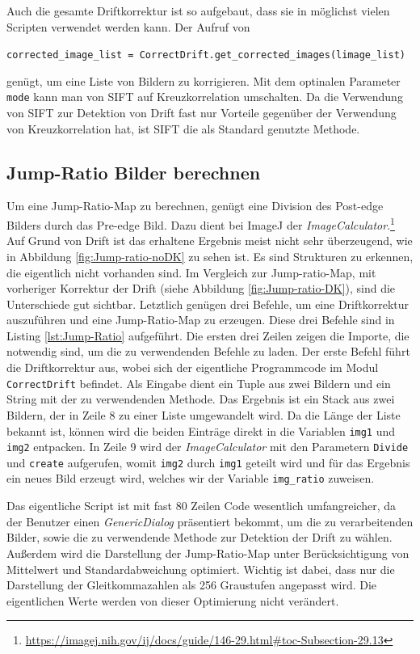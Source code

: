 \documentclass[
	paper=a4,				%
	twoside=true,			%
	BCOR=6mm,				%
	fontsize=12pt,			%
	pagesize=auto,			%
	numbers=noenddot,		%
	bibliography=totoc,		%
	draft=false
]{scrartcl}
\begin{document}
Auch die gesamte Driftkorrektur ist so aufgebaut, dass sie in möglichst vielen Scripten verwendet werden kann. Der Aufruf von 

\texttt{corrected\_image\_list = CorrectDrift.get\_corrected\_images(limage\_list)}

genügt, um eine Liste von Bildern zu korrigieren. Mit dem optinalen Parameter \texttt{mode} kann man von SIFT auf Kreuzkorrelation umschalten. Da die Verwendung von SIFT zur Detektion von Drift fast nur Vorteile gegenüber der Verwendung von Kreuzkorrelation hat, ist SIFT die als Standard genutzte Methode.

\subsection*{Jump-Ratio Bilder berechnen}\label{append:Jump-Ratio-Script}

Um eine Jump-Ratio-Map zu berechnen, genügt eine Division des Post-edge Bilders durch das Pre-edge Bild. Dazu dient bei ImageJ der \textit{ImageCalculator}.\footnote{\url{https://imagej.nih.gov/ij/docs/guide/146-29.html\#toc-Subsection-29.13}} Auf Grund von Drift ist das erhaltene Ergebnis meist nicht sehr überzeugend, wie in Abbildung \ref{fig:Jump-ratio-noDK} zu sehen ist. Es sind Strukturen zu erkennen, die eigentlich nicht vorhanden sind. Im Vergleich zur Jump-ratio-Map, mit vorheriger Korrektur der Drift (siehe Abbildung \ref{fig:Jump-ratio-DK}), sind die Unterschiede gut sichtbar. Letztlich genügen drei Befehle, um eine Driftkorrektur auszuführen und eine Jump-Ratio-Map zu erzeugen. Diese drei Befehle sind in Listing \ref{lst:Jump-Ratio} aufgeführt. Die ersten drei Zeilen zeigen die Importe, die notwendig sind, um die zu verwendenden Befehle zu laden. Der erste Befehl führt die Driftkorrektur aus, wobei sich der eigentliche Programmcode im Modul \texttt{CorrectDrift} befindet. Als Eingabe dient ein Tuple aus zwei Bildern und ein String mit der zu verwendenden Methode. Das Ergebnis ist ein Stack aus zwei Bildern, der in Zeile 8 zu einer Liste umgewandelt wird. Da die Länge der Liste bekannt ist, können wird die beiden Einträge direkt in die Variablen \texttt{img1} und \texttt{img2} entpacken. In Zeile 9 wird der \textit{ImageCalculator} mit den Parametern \texttt{Divide} und \texttt{create} aufgerufen, womit \texttt{img2} durch \texttt{img1} geteilt wird und für das Ergebnis ein neues Bild erzeugt wird, welches wir der Variable \texttt{img\_ratio} zuweisen.

Das eigentliche Script ist mit fast 80 Zeilen Code wesentlich umfangreicher, da der Benutzer einen \textit{GenericDialog} präsentiert bekommt, um die zu verarbeitenden Bilder, sowie die zu verwendende Methode zur Detektion der Drift zu wählen. Außerdem wird die Darstellung der Jump-Ratio-Map unter Berücksichtigung von Mittelwert und Standardabweichung optimiert. Wichtig ist dabei, dass nur die Darstellung der Gleitkommazahlen als 256 Graustufen angepasst wird. Die eigentlichen Werte werden von dieser Optimierung nicht verändert.
\end{document}
